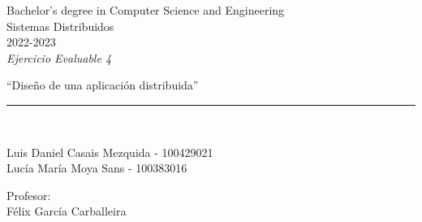 \def\degree{Bachelor's degree in Computer Science and Engineering}
\def\subject{Sistemas Distribuidos}
\def\year{2022-2023}
\def\labType{Ejercicio Evaluable 4}
\def\labName{Diseño de una aplicación distribuida}
\def\proffesor{Félix García Carballeira}

\begin{titlepage}
	\begin{sffamily}
	\color{azulUC3M}
	\begin{center}

		\begin{figure}[H]
		\end{figure}
		\vspace{1.5cm}

		\begin{Large}
			\degree\\
            \subject\\
			\year\\
			\vspace{2cm}		
			\textsl{\labType}
			\bigskip
			
		\end{Large}

		{\Huge ``\labName''}\\

		\vspace*{0.5cm}
		\rule{10.5cm}{0.1mm}\\
		\vspace*{0.9cm}
		
		{\LARGE Luis Daniel Casais Mezquida - 100429021}\\
		\vspace*{0.2cm}
        {\LARGE Lucía María Moya Sans - 100383016}\\
        \vspace*{0.2cm}
		
		\vspace*{0.8cm}
		
		\begin{Large}
		    Profesor:\\
			\proffesor\\
		\end{Large}

	\end{center}
	\vfill
	\end{sffamily}
\end{titlepage}